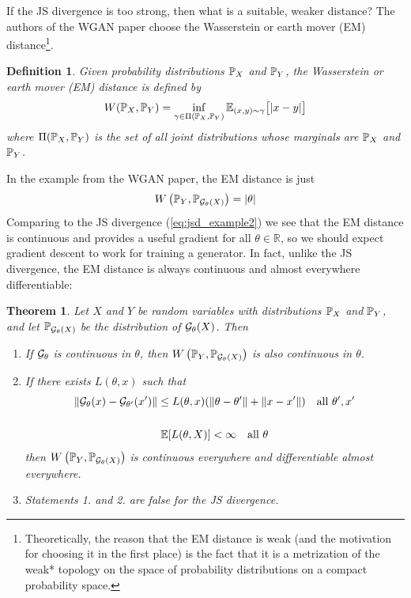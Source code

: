 \documentclass{article}
\newcommand{\R}{\mathbb{R}}
\newtheorem{defn}{Definition}
\newtheorem{theorem}{Theorem}
\begin{document}
	If the JS divergence is too strong, then what is a suitable, weaker distance? The authors of the WGAN paper choose the Wasserstein or earth mover (EM) distance\footnote{Theoretically, the reason that the EM distance is weak (and the motivation for choosing it in the first place) is the fact that it is a metrization of the weak* topology on the space of probability distributions on a compact probability space.}.
	
	\begin{defn}\label{def:wasserstein_dist}
		Given probability distributions \(\mathbb{P}_X\) and \(\mathbb{P}_Y\), the Wasserstein or earth mover (EM) distance is defined by
		\begin{equation}\label{eq:wasserstein_dist}
			W(\mathbb{P}_X, \mathbb{P}_Y) = \inf_{\gamma \in \Pi(\mathbb{P}_X, \mathbb{P}_Y)} \mathbb{E}_{(x,y) \sim \gamma}\big[|x - y|\big]
		\end{equation}
		where \(\Pi(\mathbb{P}_X, \mathbb{P}_Y)\) is the set of all joint distributions whose marginals are \(\mathbb{P}_X\) and \(\mathbb{P}_Y\).
	\end{defn}
	In the example from the WGAN paper, the EM distance is just
	\begin{equation}
		W\left(\mathbb{P}_Y, \mathbb{P}_{\mathcal{G}_{\theta}(X)}\right) = |\theta|
	\end{equation}
	Comparing to the JS divergence (\ref{eq:jsd_example2}) we see that the EM distance is continuous and provides a useful gradient for all \(\theta \in \R\), so we should expect gradient descent to work for training a generator. In fact, unlike the JS divergence, the EM distance is always continuous and almost everywhere differentiable:
	
	\begin{theorem}\label{thm:wasserstein_regularity} \cite{WGAN}
		Let \(X\) and \(Y\) be random variables with distributions \(\mathbb{P}_X\) and \(\mathbb{P}_Y\), and let \(\mathbb{P}_{\mathcal{G}_{\theta}(X)}\) be the distribution of \(\mathcal{G}_{\theta}(X)\). Then
		\begin{enumerate}
			\item If \(\mathcal{G}_{\theta}\) is continuous in \(\theta\), then \(W\left(\mathbb{P}_Y, \mathbb{P}_{\mathcal{G}_{\theta}(X)}\right)\) is also continuous in \(\theta\).
			\item If there exists \(L(\theta, x)\) such that
			\begin{gather}
				\label{eq:local_lipschitz}
				\left\lVert \mathcal{G}_{\theta}(x) - \mathcal{G}_{\theta'}(x')\right\rVert \le L(\theta, x)(\left\Vert\theta - \theta' \right\rVert + \left\lVert x - x'\right\rVert)
				\quad \text{all } \theta', x'\\\notag\\\label{eq:regularity_assumption1} 
				\mathbb{E}[L(\theta, X)] < \infty \quad \text{all } \theta
			\end{gather}
			then \(W\left(\mathbb{P}_Y, \mathbb{P}_{\mathcal{G}_{\theta}(X)}\right)\) is continuous everywhere and differentiable almost everywhere.
			\item Statements 1. and 2. are false for the JS divergence.
		\end{enumerate}
	\end{theorem}
	
\end{document}
